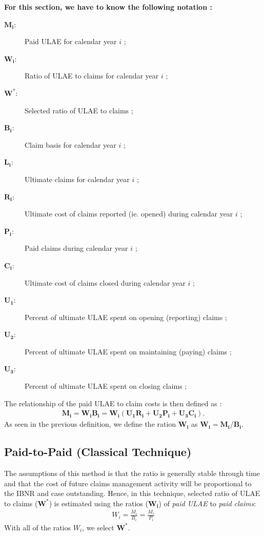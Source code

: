\documentclass[11pt, english]{memoir}
\numberwithin{definition}{section}
\begin{document}
\begin{tcolorbox}
\textbf{For this section, we have to know the following notation : }
	\begin{description} 
		\item[$ \mathbf{M_{i}} $:] Paid ULAE for calendar year $ i $ ;
		\item[$ \mathbf{W_{i}} $:] Ratio of ULAE to claims for calendar year $ i $ ;
		\item[$ \mathbf{W^{*}} $:] Selected ratio of ULAE to claims ;
		\item[$ \mathbf{B_{i}} $:] Claim basis for calendar year $ i $ ;
		\item[$ \mathbf{L_{i}} $:] Ultimate claims for calendar year $ i $ ;
		\item[$ \mathbf{R_{i}} $:] Ultimate cost of claims reported (ie. opened) during calendar year $ i $ ;
		\item[$ \mathbf{P_{i}} $:] Paid claims during calendar year $ i $ ;
		\item[$ \mathbf{C_{i}} $:] Ultimate cost of claims closed during calendar year $ i $ ;
		\item[$ \mathbf{U_{1}} $:] Percent of ultimate ULAE spent on opening (reporting) claims ;
		\item[$ \mathbf{U_{2}} $:] Percent of ultimate ULAE spent on maintaining (paying) claims  ;
		\item[$ \mathbf{U_{3}} $:] Percent of ultimate ULAE spent on closing claims ; \\
	\end{description}

The relationship of the paid ULAE to claim costs is then defined as : 
\begin{align*}
\mathbf{M_{i}= W_{i}B_{i} = W_{i}\left(U_{1}R_{i} + U_{2}P_{i} + U_{3}C_{i}\right)}.
\end{align*}
As seen in the previous definition, we define the ration $ \mathbf{W_{i}} $ as $ \mathbf{W_{i} = M_{i}/B_{i}} $.
\end{tcolorbox}




\subsection{Paid-to-Paid (Classical Technique)}
	
	The assumptions of this method is that the ratio is generally stable through time and that the cost of future claims management activity will be proportional to the IBNR and case outstanding. Hence, in this technique, selected ratio of ULAE to claims ($ \mathbf{W^{*}} $) is estimated using the ratios ($ \mathbf{W_{i}} $) of \emph{paid ULAE} to \emph{paid claims}:
	\begin{align*}
	W_{i} = \frac{M_{i}}{B_{i}} = \frac{M_{i}}{P_{i}}
	\end{align*}
	With all of the ratios $ W_{i} $, we select $ \mathbf{W^{*}} $. 
	
\end{document}

